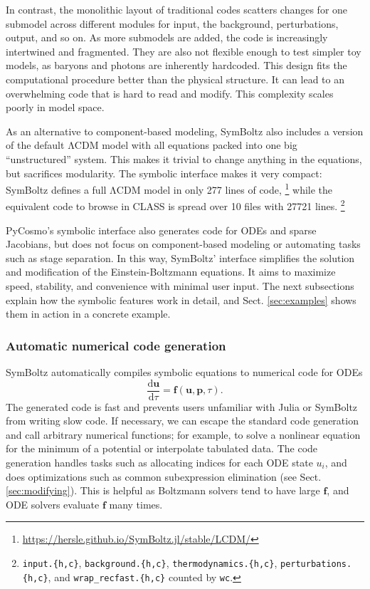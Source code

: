 \documentclass{aa}
\newcommand{\LCDM}{$\mathrm{\Lambda C D M}$}
\begin{document}
In contrast, the monolithic layout of traditional codes scatters changes for one submodel across different modules for input, the background, perturbations, output, and so on.
As more submodels are added, the code is increasingly intertwined and fragmented.
They are also not flexible enough to test simpler toy models, as baryons and photons are inherently hardcoded.
This design fits the computational procedure better than the physical structure.
It can lead to an overwhelming code that is hard to read and modify.
This complexity scales poorly in model space.

As an alternative to component-based modeling,
SymBoltz also includes a version of the default \LCDM{} model with all equations packed into one big \enquote{unstructured} system.
This makes it trivial to change anything in the equations, but sacrifices modularity.
The symbolic interface makes it very compact:
SymBoltz defines a full \LCDM{} model in only 277 lines of code,%
\footnote{\url{https://hersle.github.io/SymBoltz.jl/stable/LCDM/}}
while the equivalent code to browse in CLASS is spread over 10 files with 27721 lines.%
\footnote{\texttt{input.\{h,c\}}, \texttt{background.\{h,c\}}, \texttt{thermodynamics.\{h,c\}}, \texttt{perturbations.\{h,c\}}, and \texttt{wrap\_recfast.\{h,c\}} counted by \texttt{wc}.}

PyCosmo's symbolic interface also generates code for ODEs and sparse Jacobians,
but does not focus on component-based modeling or automating tasks such as stage separation.
In this way, SymBoltz' interface simplifies the solution and modification of the Einstein-Boltzmann equations.
It aims to maximize speed, stability, and convenience with minimal user input.
The next subsections explain how the symbolic features work in detail,
and Sect. \ref{sec:examples} shows them in action in a concrete example.

\subsubsection{Automatic numerical code generation}
\label{sec:codegen}

SymBoltz automatically compiles symbolic equations to numerical code for ODEs
\begin{equation}
    \frac{\mathrm{d}\boldsymbol{u}}{\mathrm{d} \tau} = \boldsymbol{f}(\boldsymbol{u},\boldsymbol{p},\tau).
    \label{eq:ode}
\end{equation}
The generated code is fast and prevents users unfamiliar with Julia or SymBoltz from writing slow code.
If necessary, we can escape the standard code generation and call arbitrary numerical functions; for example, to solve a nonlinear equation for the minimum of a potential or interpolate tabulated data.
The code generation handles tasks such as allocating indices for each ODE state $u_i$, and does optimizations such as common subexpression elimination (see Sect. \ref{sec:modifying}).
This is helpful as Boltzmann solvers tend to have large $\boldsymbol{f}$, and ODE solvers evaluate $\boldsymbol{f}$ many times.
\end{document}
